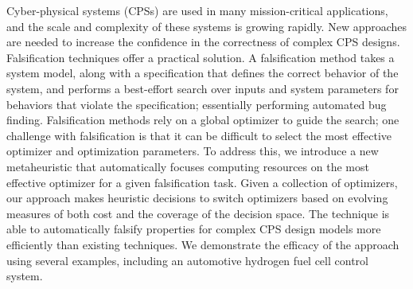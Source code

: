 Cyber-physical systems (CPSs) are used in many mission-critical applications, and the scale and complexity of these systems is growing rapidly.
New approaches are needed to increase the confidence in the correctness of complex CPS designs.
Falsification techniques offer a practical solution. 
A falsification method takes a system model, along with a specification that defines the correct behavior of the system, and performs a best-effort search over inputs and system parameters for behaviors that violate the specification; essentially performing automated bug finding.
Falsification methods rely on a global optimizer to guide the search; one challenge with falsification is that it can be difficult to select the most effective optimizer and optimization parameters.
To address this, we introduce a new metaheuristic that automatically focuses computing resources on the most effective optimizer for a given falsification task.
Given a collection of optimizers, our approach makes heuristic decisions to switch optimizers based on
evolving measures of both cost and the coverage of the decision space.
The technique is able to automatically falsify properties for complex CPS design models more efficiently than existing techniques.
We demonstrate the efficacy of the approach using several examples, including an automotive hydrogen fuel cell control system.